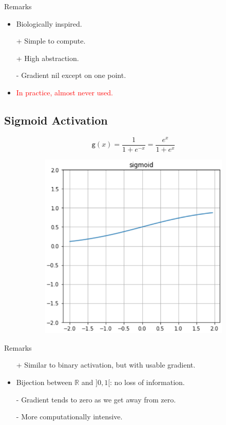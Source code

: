 \documentclass{book}
\newcommand{\act}{\texttt{g}}%
\newcommand{\R}{\mathbb{R}}
\newcommand{\alert}[1]{\textcolor{red}{#1}}
\begin{document}
\begin{block}{Remarks}
\begin{itemize}
\item Biologically inspired.
\item[+] Simple to compute.
\item[+] High abstraction.
\item[-] Gradient nil except on one point.
\item \alert{In practice, almost never used.}
\end{itemize}
\end{block}

\subsection{Sigmoid Activation}

\begin{figure}[h]
    \centering
    \begin{subfigure}{.5\textwidth}
        \[
        \act(x)= \frac{1}{1 + e^{-x}} = \frac{e^{x}}{1+e^{x}}
        \]
    \end{subfigure}
    \begin{subfigure}{.5\textwidth}
        \includegraphics[width=.8\textwidth]{act_sigm.png}
    \end{subfigure}
\end{figure}

\begin{block}{Remarks}
\begin{itemize}
\item[+] Similar to binary activation, but with usable gradient.
\item Bijection between $\R$ and $]0, 1[$: no loss of information.
\item[-] Gradient tends to zero as we get away from zero.
\item[-] More computationally intensive.
\end{itemize}
\end{block}
\end{document}
